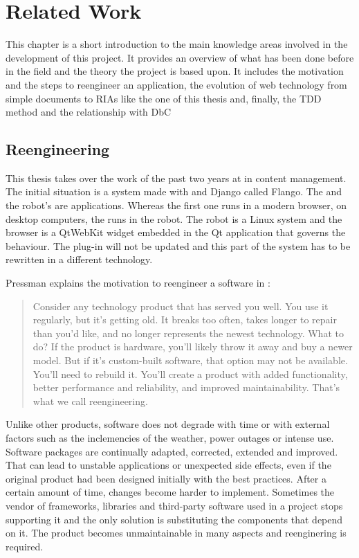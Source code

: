 \chapter{Related Work}
This chapter is a short introduction to the main knowledge areas involved in the development of this project.
It provides an overview of what has been done before in the field and the theory the project is based upon.
It includes the motivation and the steps to reengineer an application, the evolution of web technology from simple documents to \acp{RIA} like the one of this thesis and, finally, the \ac{TDD} method and the relationship with \ac{DbC}

\section{Reengineering}
\label{sec:reengineering}
This thesis takes over the work of the past two years at \company in content management.
The initial situation is a system made with \flash and Django called Flango.
The \se and the robot's \cm are \flash applications.
Whereas the first one runs in a modern browser, on desktop computers, the \cm runs in the robot.
The robot is a Linux system and the browser is a QtWebKit widget embedded in the Qt application that governs the behaviour.
The \flash plug-in will not be updated and this part of the system has to be rewritten in a different technology.

Pressman explains the motivation to reengineer a software in \cite{Pressman:2007}:
\begin{quote} 
Consider any technology product that has served you well. 
You use it regularly, but it's getting old. 
It breaks too often, takes longer to repair than you'd like, and no longer represents the newest technology.
What to do? If the product is hardware, you'll likely throw it away and buy a newer model.
But if it's custom-built software, that option may not be available. 
You'll need to rebuild it. 
You'll create a product with added functionality, better performance and reliability, and improved maintainability.
That's what we call reengineering. 
\end{quote}

Unlike other products, software does not degrade with time or with external factors such as the inclemencies of the weather, power outages or intense use.
Software packages are continually adapted, corrected, extended and improved.
That can lead to unstable applications or unexpected side effects, even if the original product had been designed initially with the best practices.
After a certain amount of time, changes become harder to implement. 
Sometimes the vendor of frameworks, libraries and third-party software used in a project stops supporting it and the only solution is substituting the components that depend on it. 
The product becomes unmaintainable in many aspects and reenginering is required. 


